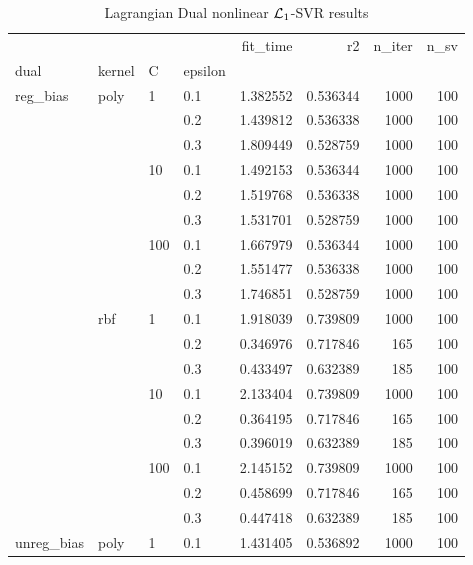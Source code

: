 \begin{table}[H]
\centering
\caption{Lagrangian Dual nonlinear $\protect \mathcal{L}_1$-SVR results}
\label{nonlinear_lagrangian_dual_l1_svr_cv_results}
\begin{tabular}{llllrrrr}
\toprule
           &     &     &     &  fit\_time &        r2 &  n\_iter &  n\_sv \\
dual & kernel & C & epsilon &           &           &         &       \\
\midrule
reg\_bias & poly & 1   & 0.1 &  1.382552 &  0.536344 &    1000 &   100 \\
           &     &     & 0.2 &  1.439812 &  0.536338 &    1000 &   100 \\
           &     &     & 0.3 &  1.809449 &  0.528759 &    1000 &   100 \\
           &     & 10  & 0.1 &  1.492153 &  0.536344 &    1000 &   100 \\
           &     &     & 0.2 &  1.519768 &  0.536338 &    1000 &   100 \\
           &     &     & 0.3 &  1.531701 &  0.528759 &    1000 &   100 \\
           &     & 100 & 0.1 &  1.667979 &  0.536344 &    1000 &   100 \\
           &     &     & 0.2 &  1.551477 &  0.536338 &    1000 &   100 \\
           &     &     & 0.3 &  1.746851 &  0.528759 &    1000 &   100 \\
           & rbf & 1   & 0.1 &  1.918039 &  0.739809 &    1000 &   100 \\
           &     &     & 0.2 &  0.346976 &  0.717846 &     165 &   100 \\
           &     &     & 0.3 &  0.433497 &  0.632389 &     185 &   100 \\
           &     & 10  & 0.1 &  2.133404 &  0.739809 &    1000 &   100 \\
           &     &     & 0.2 &  0.364195 &  0.717846 &     165 &   100 \\
           &     &     & 0.3 &  0.396019 &  0.632389 &     185 &   100 \\
           &     & 100 & 0.1 &  2.145152 &  0.739809 &    1000 &   100 \\
           &     &     & 0.2 &  0.458699 &  0.717846 &     165 &   100 \\
           &     &     & 0.3 &  0.447418 &  0.632389 &     185 &   100 \\
unreg\_bias & poly & 1   & 0.1 &  1.431405 &  0.536892 &    1000 &   100 \\

\end{tabular}
\end{table}
